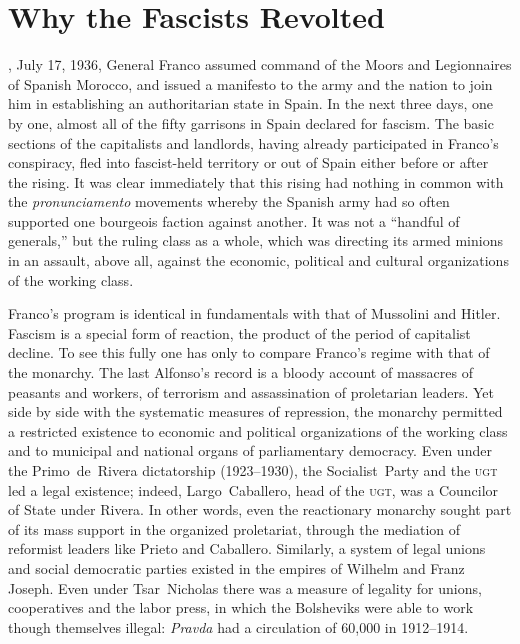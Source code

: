 \chapter{Why the Fascists Revolted}

, July 17, 1936, General Franco{\indexFFranco} assumed command of the Moors and Legionnaires of Spanish Morocco, and issued a manifesto to the army and the nation to join him in establishing an authoritarian state in Spain. In the next three days, one by one, almost all of the fifty garrisons in Spain declared for fascism. The basic sections of the capitalists and landlords, having already participated in Franco’s conspiracy, fled into fascist-held territory or out of Spain either before or after the rising. It was clear immediately that this rising had nothing in common with the \emph{pronunciamento} movements whereby the Spanish army had so often supported one bourgeois faction against another. It was not a ``handful of generals,'' but the ruling class as a whole, which was directing its armed minions in an assault, above all, against the economic, political and cultural organizations of the working class.

Franco’s program is identical in fundamentals with that of Mussolini and Hitler. Fascism is a special form of reaction, the product of the period of capitalist decline. To see this fully one has only to compare Franco’s regime with that of the monarchy. The last Alfonso’s record is a bloody account of massacres of peasants and workers, of terrorism and assassination of proletarian leaders. Yet side by side with the systematic measures of repression, the monarchy permitted a restricted existence to economic and political organizations of the working class and to municipal and national organs of parliamentary democracy. Even under the Primo~de~Rivera dictatorship (1923--1930), the Socialist~Party and the \textsc{ugt} led a legal existence; indeed, Largo~Caballero{\indexLCaballero}, head of the \textsc{ugt}, was a Councilor of State under Rivera. In other words, even the reactionary monarchy sought part of its mass support in the organized proletariat, through the mediation of reformist leaders like Prieto and Caballero. Similarly, a system of legal unions and social democratic parties existed in the empires of Wilhelm and Franz Joseph. Even under Tsar~Nicholas there was a measure of legality for unions, cooperatives and the labor press, in which the Bolsheviks were able to work though themselves illegal: \emph{Pravda} had a circulation of 60,000 in 1912--1914.

